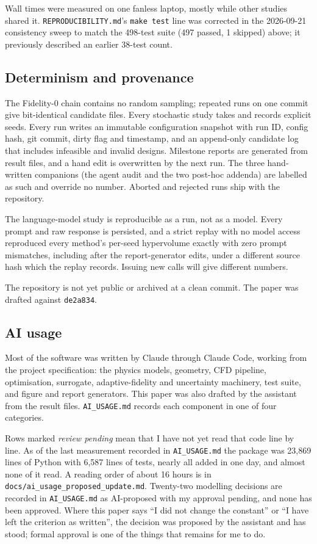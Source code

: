 \documentclass[
  a4paper,
  11pt]{article}
\begin{document}
Wall times were measured on one fanless laptop, mostly while other
studies shared it. \texttt{REPRODUCIBILITY.md}'s \texttt{make test} line
was corrected in the 2026-09-21 consistency sweep to match the 498-test
suite (497 passed, 1 skipped) above; it previously described an earlier
38-test count.

\subsection{Determinism and provenance}

The Fidelity-0 chain contains no random sampling; repeated runs on one
commit give bit-identical candidate files. Every stochastic study takes
and records explicit seeds. Every run writes an immutable configuration
snapshot with run ID, config hash, git commit, dirty flag and timestamp,
and an append-only candidate log that includes infeasible and invalid
designs. Milestone reports are generated from result files, and a hand
edit is overwritten by the next run. The three hand-written companions
(the agent audit and the two post-hoc addenda) are labelled as such and
override no number. Aborted and rejected runs ship with the repository.

The language-model study is reproducible as a run, not as a model. Every
prompt and raw response is persisted, and a strict replay with no model
access reproduced every method's per-seed hypervolume exactly with zero
prompt mismatches, including after the report-generator edits, under a
different source hash which the replay records. Issuing new calls will
give different numbers.

The repository is not yet public or archived at a clean commit. The
paper was drafted against \texttt{de2a834}.

\subsection{AI usage}

Most of the software was written by Claude through Claude Code, working
from the project specification: the physics models, geometry, CFD
pipeline, optimisation, surrogate, adaptive-fidelity and uncertainty
machinery, test suite, and figure and report generators. This paper was
also drafted by the assistant from the result files.
\texttt{AI\_\allowbreak{}USAGE.md} records each component in one of four
categories.

Rows marked \emph{review pending} mean that I have not yet read that
code line by line. As of the last measurement recorded in
\texttt{AI\_\allowbreak{}USAGE.md} the package was 23,869 lines of
Python with 6,587 lines of tests, nearly all added in one day, and
almost none of it read. A reading order of about 16 hours is in
\texttt{docs/\allowbreak{}ai\_\allowbreak{}usage\_\allowbreak{}proposed\_\allowbreak{}update.md}.
Twenty-two modelling decisions are recorded in
\texttt{AI\_\allowbreak{}USAGE.md} as AI-proposed with my approval
pending, and none has been approved. Where this paper says ``I did not
change the constant'' or ``I have left the criterion as written'', the
decision was proposed by the assistant and has stood; formal approval is
one of the things that remains for me to do.
\end{document}
